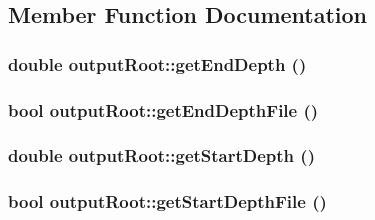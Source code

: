 \subsection{Member Function Documentation}
\hypertarget{classoutput_root_ad08bca9e6f7597acc61b9802b16d9f77}{
\subsubsection[{getEndDepth}]{\setlength{\rightskip}{0pt plus 5cm}double outputRoot::getEndDepth ()}}
\label{classoutput_root_ad08bca9e6f7597acc61b9802b16d9f77}
\hypertarget{classoutput_root_a27e5c67b135531f5f9b9f67ecad623a8}{
\subsubsection[{getEndDepthFile}]{\setlength{\rightskip}{0pt plus 5cm}bool outputRoot::getEndDepthFile ()}}
\label{classoutput_root_a27e5c67b135531f5f9b9f67ecad623a8}
\hypertarget{classoutput_root_a4f67ae8b19459fffc4dfce60c3e240c1}{
\subsubsection[{getStartDepth}]{\setlength{\rightskip}{0pt plus 5cm}double outputRoot::getStartDepth ()}}
\label{classoutput_root_a4f67ae8b19459fffc4dfce60c3e240c1}
\hypertarget{classoutput_root_ab142f85c1a6e3512fe952491fdc15691}{
\subsubsection[{getStartDepthFile}]{\setlength{\rightskip}{0pt plus 5cm}bool outputRoot::getStartDepthFile ()}}
\label{classoutput_root_ab142f85c1a6e3512fe952491fdc15691}

